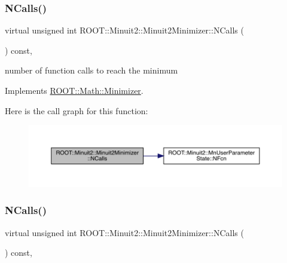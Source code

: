 \subsubsection{\texorpdfstring{NCalls()}{NCalls()}\hspace{0.1cm}{\footnotesize\ttfamily [2/3]}}
{\footnotesize\ttfamily virtual unsigned int R\+O\+O\+T\+::\+Minuit2\+::\+Minuit2\+Minimizer\+::\+N\+Calls (\begin{DoxyParamCaption}{ }\end{DoxyParamCaption}) const\hspace{0.3cm}{\ttfamily [inline]}, {\ttfamily [virtual]}}



number of function calls to reach the minimum 



Implements \mbox{\hyperlink{classROOT_1_1Math_1_1Minimizer_abf8b2e97d47843a1fde7a54cb51c1f0e}{R\+O\+O\+T\+::\+Math\+::\+Minimizer}}.

Here is the call graph for this function\+:
\nopagebreak
\begin{figure}[H]
\begin{center}
\leavevmode
\includegraphics[width=350pt]{d0/d9c/classROOT_1_1Minuit2_1_1Minuit2Minimizer_ab5faf7c3dc0b3743eee8352c62a6ccfd_cgraph}
\end{center}
\end{figure}
\mbox{\label{classROOT_1_1Minuit2_1_1Minuit2Minimizer_ab5faf7c3dc0b3743eee8352c62a6ccfd}} 
\subsubsection{\texorpdfstring{NCalls()}{NCalls()}\hspace{0.1cm}{\footnotesize\ttfamily [3/3]}}
{\footnotesize\ttfamily virtual unsigned int R\+O\+O\+T\+::\+Minuit2\+::\+Minuit2\+Minimizer\+::\+N\+Calls (\begin{DoxyParamCaption}{ }\end{DoxyParamCaption}) const\hspace{0.3cm}{\ttfamily [inline]}, {\ttfamily [virtual]}}



